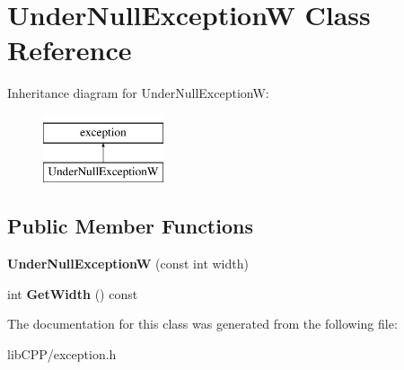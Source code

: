 \hypertarget{classUnderNullExceptionW}{\section{Under\-Null\-Exception\-W Class Reference}
\label{classUnderNullExceptionW}
}
Inheritance diagram for Under\-Null\-Exception\-W\-:\begin{figure}[H]
\begin{center}
\leavevmode
\includegraphics[height=2.000000cm]{classUnderNullExceptionW}
\end{center}
\end{figure}
\subsection*{Public Member Functions}
\begin{DoxyCompactItemize}
\item 
\hypertarget{classUnderNullExceptionW_ae4b45aecdce50c8a4dbdba6d9a2f5140}{{\bfseries Under\-Null\-Exception\-W} (const int width)}\label{classUnderNullExceptionW_ae4b45aecdce50c8a4dbdba6d9a2f5140}

\item 
\hypertarget{classUnderNullExceptionW_acf723be6bcb5b1697367a722626c21dd}{int {\bfseries Get\-Width} () const }\label{classUnderNullExceptionW_acf723be6bcb5b1697367a722626c21dd}

\end{DoxyCompactItemize}


The documentation for this class was generated from the following file\-:\begin{DoxyCompactItemize}
\item 
lib\-C\-P\-P/exception.\-h\end{DoxyCompactItemize}
